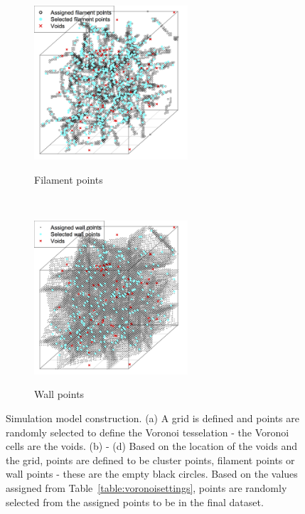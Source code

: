 \documentclass[12pt]{article}
\begin{document}
\begin{figure}[t!]
     \begin{subfigure}[t]{0.5\textwidth}
      \centering
           \caption{Filament points}
    \includegraphics[height=2.25in]{fig_vf_fil.png}
 \label{subfig:fil}
    \end{subfigure}%
    ~
    \begin{subfigure}[t]{0.5\textwidth}
        \centering
                \caption{Wall points}
        \includegraphics[height=2.25in]{fig_vf_wall.png}
 \label{subfig:wall}
    \end{subfigure}
    \caption{Simulation model construction.  (a) A grid is defined and points are randomly selected to define the Voronoi tesselation - the Voronoi cells are the voids.  (b) - (d) Based on the location of the voids and the grid, points are defined to be cluster points, filament points or wall points - these are the empty black circles.  Based on the values assigned from Table~\ref{table:voronoisettings}, points are randomly selected from the assigned points to be in the final dataset.} \label{fig:vf}
\end{figure}
\end{document}
